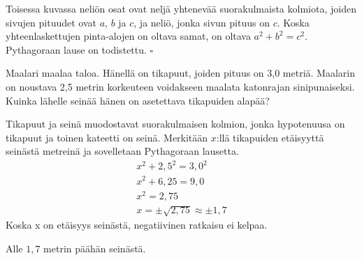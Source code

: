 Toisessa kuvassa neliön osat ovat neljä yhtenevää suorakulmaista kolmiota, joiden
sivujen pituudet ovat $a$, $b$ ja $c$, ja neliö, jonka sivun pituus on $c$.
Koska yhteenlaskettujen pinta-alojen on oltava samat, on oltava $a^2 + b^2 = c^2$.
Pythagoraan lause on todistettu. $\square $

\begin{esimerkki}
	Maalari maalaa taloa. Hänellä on tikapuut, joiden pituus on 3,0 metriä. Maalarin on
	noustava 2,5 metrin korkeuteen voidakseen maalata katonrajan sinipunaiseksi. Kuinka
	lähelle seinää hänen on asetettava tikapuiden alapää?
	\begin{esimratk}
		Tikapuut ja seinä muodostavat suorakulmaisen kolmion, jonka hypotenuusa on tikapuut
		ja toinen kateetti on seinä. Merkitään $x$:llä tikapuiden etäisyyttä seinästä
		metreinä ja sovelletaan Pythagoraan lausetta.
		\begin{align*}
		x^2 + 2,5^2 = 3,0^2 \\
		x^2 + 6,25 = 9,0 \\
		x^2 = 2,75 \\
		x = \pm \sqrt{2,75} \approx \pm 1,7
		\end{align*}
		Koska x on etäisyys seinästä, negatiivinen ratkaisu ei kelpaa.
		\begin{esimvast}
		Alle $1,7$ metrin päähän seinästä. 
		\end{esimvast}
	\end{esimratk}
\end{esimerkki}


